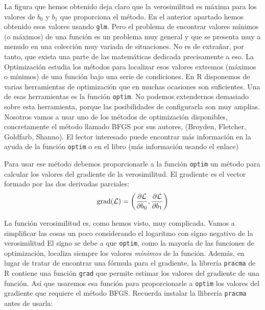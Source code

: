 \documentclass[10pt,a4paper]{article}\usepackage[]{graphicx}\usepackage[]{color}
\newcounter {cont01}
\begin{document}
La figura que hemos obtenido deja claro que la verosimilitud es máxima para los valores de $b_0$ y $b_1$ que proporciona el método. En el anterior apartado hemos obtenido esos valores usando {\tt glm}. Pero el problema de encontrar valores mínimos (o máximos) de una función es un problema muy general y que se presenta muy a menudo en una colección muy variada de situaciones. No es de extrañar, por tanto, que exista una parte de las matemáticas dedicada precisamente a eso. La {\sf Optimización} estudia los métodos para localizar esos valores extremos (máximos o mínimos) de una función bajo una serie de condiciones. En R disponemos de varias herramientas de optimización que en muchas ocasiones son suficientes. Una de esas herramientas es la función {\tt optim}. No podemos extendernos demasiado sobre esta herramienta, porque las posibilidades de configurarla son muy amplias. Nosotros vamos a usar uno de los métodos de optimización disponibles, concretamente el método llamado {\sf BFGS} por sus autores, (Broyden, Fletcher, Goldfarb, Shanno). El lector interesado puede encontrar más información en la ayuda de la función {\tt optim} o en el libro (más información usando el enlace)
\begin{center}
\end{center}

Para usar ese método debemos proporcionarle a la función {\tt optim} un método para calcular los valores del {\sf gradiente} de la verosimilitud. El gradiente es el vector formado por las dos derivadas parciales:
\[
\operatorname{grad}({\cal L}) = \left(
\dfrac{\partial {\cal L}}{\partial b_0}, \dfrac{\partial {\cal L}}{\partial b_1}
\right)
\]

La función verosimilitud es, como hemos visto, muy complicada. Vamos a simplificar las cosas un poco considerando el logaritmo con signo negativo de la verosimilitud El signo se debe a que {\tt optim}, como la mayoría de las funciones de optimización, localiza siempre los valores {\em mínimos} de la función. Además, en lugar de tratar de encontrar una fórmula para el gradiente, la librería {\tt pracma} de R contiene una función {\tt grad} que permite estimar los valores del gradiente de una función. Así que usaremos esa función para proporcionarle a {\tt optim} los valores del gradiente que requiere el método {\sf BFGS}. Recuerda instalar la llibrería {\tt pracma} antes de usarla:
\end{document}
